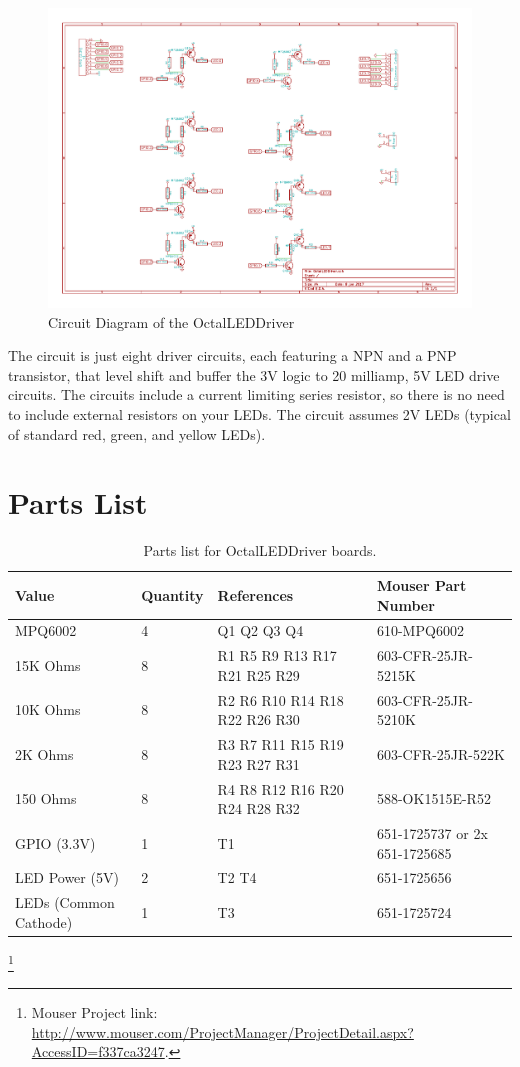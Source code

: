 \begin{figure}[hbpt]\begin{centering}%
\includegraphics[width=5in]{OctalLEDDriver.pdf}
\caption{Circuit Diagram of the OctalLEDDriver}
\end{centering}\end{figure}
The circuit is just eight driver circuits, each featuring a NPN and a PNP
transistor, that level shift and buffer the 3V logic to 20 milliamp, 5V LED
drive circuits. The circuits include a current limiting series resistor, so
there is no need to include external resistors on your LEDs. The circuit
assumes 2V LEDs (typical of standard red, green, and yellow LEDs).

\section{Parts List}

\begin{table}[htdp]
\begin{centering}\begin{tabular}{|l|l|p{1in}|l|}
\hline
Value&Quantity&References&Mouser Part Number\\
\hline
MPQ6002&4&Q1 Q2 Q3 Q4&610-MPQ6002\\
\hline
15K Ohms&8&R1 R5 R9 R13 R17 R21 R25 R29&603-CFR-25JR-5215K\\
\hline
10K Ohms&8&R2 R6 R10 R14 R18 R22 R26 R30&603-CFR-25JR-5210K\\
\hline
2K Ohms&8&R3 R7 R11 R15 R19 R23 R27 R31&603-CFR-25JR-522K\\
\hline
150 Ohms&8&R4 R8 R12 R16 R20 R24 R28 R32&588-OK1515E-R52\\
\hline
GPIO (3.3V)&1&T1&651-1725737 or 2x 651-1725685 \\
\hline
LED Power (5V)&2&T2 T4&651-1725656\\
\hline
LEDs (Common Cathode)&1&T3&651-1725724\\
\hline
\end{tabular}
\caption{Parts list for OctalLEDDriver boards.}
\end{centering}\end{table}\footnote{Mouser Project link: 
\url{http://www.mouser.com/ProjectManager/ProjectDetail.aspx?AccessID=f337ca3247}.}


